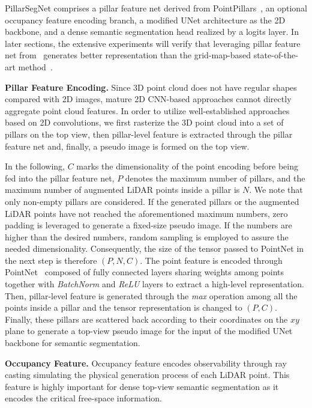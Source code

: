 \documentclass[lettersize,journal]{IEEEtran}
\begin{document}
PillarSegNet comprises a pillar feature net derived from PointPillars~\cite{pointpillars}, an optional occupancy feature encoding branch, a modified UNet architecture as the 2D backbone, and a dense semantic segmentation head realized by a logits layer.
In later sections, the extensive experiments will verify that leveraging pillar feature net from~\cite{pointpillars} generates better representation than the grid-map-based state-of-the-art method~\cite{bieder2020exploiting}.

\textbf{Pillar Feature Encoding.}
Since 3D point cloud does not have regular shapes compared with 2D images, mature 2D CNN-based approaches cannot directly aggregate point cloud features.
In order to utilize well-established approaches based on 2D convolutions, we first rasterize the 3D point cloud into a set of pillars on the top view, then pillar-level feature is extracted through the pillar feature net and, finally, a pseudo image is formed on the top view.

In the following, $C$ marks the dimensionality of the point encoding before being fed into the pillar feature net, $P$ denotes the maximum number of pillars, and the maximum number of augmented LiDAR points inside a pillar is $N$.
We note that only non-empty pillars are considered.
If the generated pillars or the augmented LiDAR points have not reached the aforementioned maximum numbers, zero padding is leveraged to generate a fixed-size pseudo image.
If the numbers are higher than the desired numbers, random sampling is employed to assure the needed dimensionality.
Consequently, the size of the  tensor passed to PointNet in the next step is therefore $(P, N, C)$. The point feature is encoded through PointNet~\cite{pointnet} composed of fully connected layers sharing weights among points together with \emph{BatchNorm} and \emph{ReLU} layers to extract a high-level representation. Then, pillar-level feature is generated through the \emph{max} operation among all the points inside a pillar and the tensor representation is changed to $(P, C)$.
Finally, these pillars are scattered back according to their coordinates on the $xy$ plane to generate a top-view pseudo image for the input of the modified UNet backbone for semantic segmentation.

\textbf{Occupancy Feature.}
Occupancy feature encodes observability through ray casting simulating the physical generation process of each LiDAR point.
This feature is highly important for dense top-view semantic segmentation as it encodes the critical free-space information.
\end{document}
